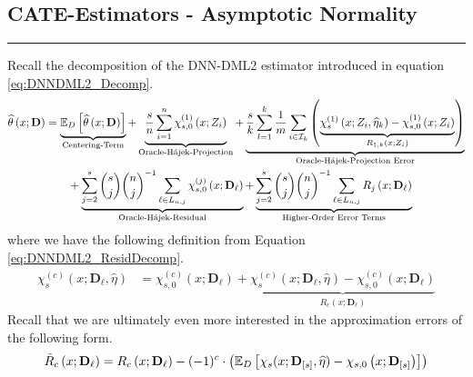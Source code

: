 \subsection{CATE-Estimators - Asymptotic Normality}
\hrule
Recall the decomposition of the DNN-DML2 estimator introduced in equation \ref{eq:DNNDML2_Decomp}.
\begin{equation}
    \begin{aligned}
        \widehat{\theta}\left(x; \mathbf{D}\right)
        & = \underbrace{\mathbb{E}_{D}\left[\widehat{\theta}\left(x; \mathbf{D}\right)\right]}_{\text{Centering-Term}}
        + \underbrace{\frac{s}{n}\sum_{i = 1}^{n} \chi_{s,0}^{(1)}\left(x; Z_{i}\right)}_{\text{Oracle-H\'ajek-Projection}}
        + \underbrace{\frac{s}{k} \sum_{l = 1}^{k} \frac{1}{m} \sum_{i \in \mathcal{I}_{k}}\left(\underbrace{\chi_{s}^{(1)}\left(x; Z_{i}, \widehat{\eta}_{k}\right) - \chi_{s,0}^{(1)}\left(x; Z_{i}\right)}_{R_{1,k}\left(x; Z_{i}\right)}\right)}_{\text{Oracle-H\'ajek-Projection Error}}\\
        & \quad \quad + \underbrace{\sum_{j = 2}^{s} \binom{s}{j} \binom{n}{j}^{-1}\sum_{\ell \in L_{n,j}} \chi_{s,0}^{(j)}\left(x; \mathbf{D}_{\ell}\right)}_{\text{Oracle-H\'ajek-Residual}}
         + \underbrace{\sum_{j = 2}^{s} \binom{s}{j} \binom{n}{j}^{-1}\sum_{\ell \in L_{n,j}} R_{j}\left(x; \mathbf{D}_{\ell}\right)}_{\text{Higher-Order Error Terms}}
    \end{aligned}
\end{equation}
where we have the following definition from Equation \ref{eq:DNNDML2_ResidDecomp}.
\begin{equation}
    \begin{aligned}
        \chi_{s}^{(c)}\left(x; \mathbf{D}_{\ell}, \hat{\eta}\right)
        & = \chi_{s,0}^{(c)}\left(x; \mathbf{D}_{\ell}\right) + \underbrace{\chi_{s}^{(c)}\left(x; \mathbf{D}_{\ell}, \hat{\eta}\right) - \chi_{s,0}^{(c)}\left(x; \mathbf{D}_{\ell}\right)}_{R_{c}\left(x; \mathbf{D}_{\ell}\right)}
    \end{aligned}
\end{equation}
Recall that we are ultimately even more interested in the approximation errors of the following form.
\begin{equation}
    \tilde{R}_{c}\left(x; \mathbf{D}_{\ell}\right)
     = R_{c}\left(x; \mathbf{D}_{\ell}\right) - (-1)^{c} \cdot \left(\mathbb{E}_{D}\left[\chi_{s}(x; \mathbf{D}_{[s]}, \widehat{\eta}) - \chi_{s,0}\left(x; \mathbf{D}_{[s]}\right)\right]\right)
\end{equation}

